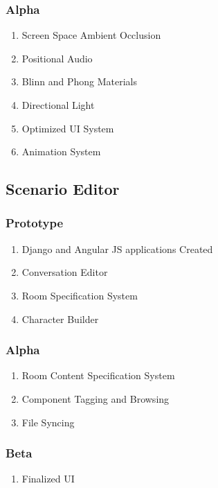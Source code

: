 \documentclass{GlobalDocument}
\begin{document}
\subsubsection{Alpha}
\begin{enumerate}
\item Screen Space Ambient Occlusion
\item Positional Audio
\item Blinn and Phong Materials
\item Directional Light
\item Optimized UI System
\item Animation System
\end{enumerate}

\subsection{Scenario Editor}
\subsubsection{Prototype}
\begin{enumerate}
\item Django and Angular JS applications Created
\item Conversation Editor
\item Room Specification System
\item Character Builder
\end{enumerate}

\subsubsection{Alpha} 
\begin{enumerate}
\item Room Content Specification System
\item Component Tagging and Browsing
\item File Syncing
\end{enumerate}

\subsubsection{Beta}
\begin{enumerate}
\item Finalized UI
\end{enumerate}


\clearpage
\end{document}
